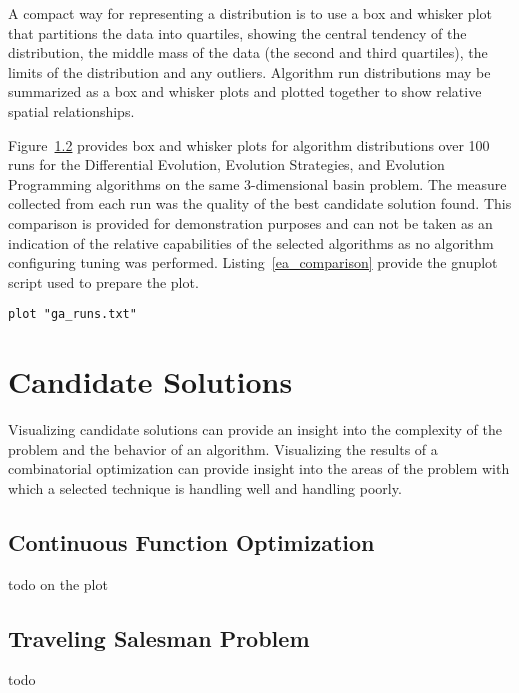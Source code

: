 \documentclass[a4paper, 11pt]{article}
\begin{document}
A compact way for representing a distribution is to use a box and whisker plot that partitions the data into quartiles, showing the central tendency of the distribution, the middle mass of the data (the second and third quartiles), the limits of the distribution and any outliers. Algorithm run distributions may be summarized as a box and whisker plots and plotted together to show relative spatial relationships.

Figure~\ref{} provides box and whisker plots for algorithm distributions over 100 runs for the Differential Evolution, Evolution Strategies, and Evolution Programming algorithms on the same 3-dimensional basin problem. The measure collected from each run was the quality of the best candidate solution found. This comparison is provided for demonstration purposes and can not be taken as an indication of the relative capabilities of the selected algorithms as no algorithm configuring tuning was performed. Listing~\ref{ea_comparison} provide the gnuplot script used to prepare the plot.


\begin{lstlisting}[caption=Boxplots of the best solutions found by DE ES and EP algorithms on a 3-dimensional basin problem over 100 runs, label=ea_comparison]
plot "ga_runs.txt"
\end{lstlisting}

%
%
\section{Candidate Solutions}
Visualizing candidate solutions can provide an insight into the complexity of the problem and the behavior of an algorithm. Visualizing the results of a combinatorial optimization can provide insight into the areas of the problem with which a selected technique is handling well and handling poorly. 


\subsection{Continuous Function Optimization}
todo
on the plot


\subsection{Traveling Salesman Problem}
todo
\end{document}
